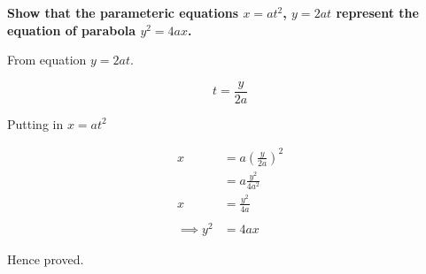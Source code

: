 \documentclass[crop=false,fleqn]{standalone}
\begin{document}
    \textbf{
        Show that the parameteric equations $x=at^2$, $y=2at$
        represent the equation of parabola $y^2=4ax$.
    }

    From equation $y=2at$.

    $$
    t=\frac{y}{2a}
    $$

    Putting in $x=at^2$

    \begin{align*}
        x &= a\left(\frac{y}{2a}\right)^2 \\
            &= a\frac{y^2}{4a^2} \\
        x &= \frac{y^2}{4a} \\
        \\
        \implies y^2 &= 4ax \tag{By Rearranging}
    \end{align*}

    Hence proved.
\end{document}
